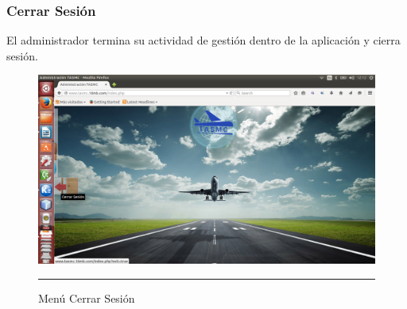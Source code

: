 \subsubsection{Cerrar Sesión}
El administrador termina su actividad de gestión dentro de la aplicación y cierra sesión.
\begin{figure}[h!]
	\centering
		\includegraphics[width=1\textwidth]{Figuras/indexCerrarSesion.png}
		\rule{35em}{0.5pt}
	\caption[Menú Cerrar Sesión]{Menú Cerrar Sesión}
	\label{fig:menuCerrar}
\end{figure}
\clearpage
